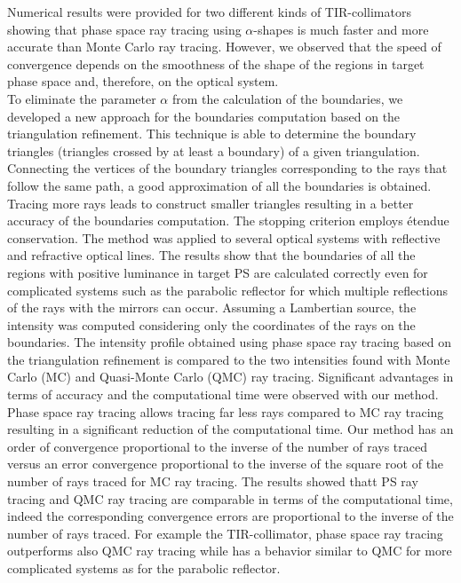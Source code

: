 Numerical results were provided for two different kinds of TIR-collimators showing that phase space ray tracing using $\alpha$-shapes is much faster and more accurate than Monte Carlo ray tracing. However, we observed that the speed of convergence depends on the smoothness of the shape of the regions in target phase space and, therefore, on the optical system. \\ \indent To eliminate the parameter $\alpha$ from the calculation of the boundaries, we developed a new approach for the boundaries computation based on the triangulation refinement. 
This technique is able to determine the boundary triangles (triangles crossed by at least a boundary) of a given triangulation. Connecting the vertices of the boundary triangles corresponding to the rays that follow the same path, a good approximation of all the boundaries is obtained. Tracing more rays leads to construct smaller triangles resulting in a better accuracy of the boundaries computation. The stopping criterion employs \'{e}tendue conservation. 
The method was applied to several optical systems with reflective and refractive optical lines. The results show that the boundaries of all the regions with positive luminance in target PS are calculated correctly even for complicated systems such as the parabolic reflector for which multiple reflections of the rays with the mirrors can occur. Assuming a Lambertian source, the intensity was computed considering only the coordinates of the rays on the boundaries. 
The intensity profile obtained using phase space ray tracing based on the triangulation refinement is compared to the two intensities found with Monte Carlo (MC) and Quasi-Monte Carlo (QMC) ray tracing. Significant advantages in terms of accuracy and the computational time were observed with our method. Phase space ray tracing allows tracing far less rays compared to MC ray tracing resulting in a significant reduction of the computational time. Our method has an order of convergence proportional to the inverse of the number of rays traced versus an error convergence proportional to the inverse of the square root of the number of rays traced for MC ray tracing. The results showed thatt PS ray tracing and QMC ray tracing are comparable in terms of the computational time, indeed the corresponding convergence errors are proportional to the inverse of the number of rays traced. For example the TIR-collimator, phase space ray tracing outperforms also QMC ray tracing while has a behavior similar to QMC for more complicated systems as for the parabolic reflector.
